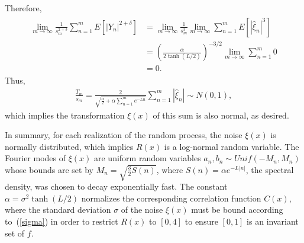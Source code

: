 Therefore, 
\begin{align*}
\begin{split}
\lim_{m\to
  \infty}\frac{1}{s_m^{2+\delta}}\sum_{n=1}^mE[|Y_n|^{2+\delta}] &= \lim_{m\to
  \infty}\frac{1}{s_m^{3}}\lim_{m\to
  \infty}\sum_{n=1}^mE[|\hat{\xi}_{n}|^{3}] \\
&= \left(\frac{\alpha}{2 \tanh(L/2)}\right)^{-3/2}\lim_{m\to \infty}\sum_{n=1}^m 0 \\
&= 0.
\end{split}
\end{align*}
Thus, 
\begin{align*}
\frac{T_m}{s_m} = \frac{2}{\sqrt{\frac{\alpha}{2} +\alpha\sum_{n=1}^m e^{-Ln}}} \sum_{n=1}^{m} |\hat{\xi}_{n}|\sim N(0,1),
\end{align*}
which implies the transformation $\xi(x)$ of this sum is also normal,
as desired.  

In summary, for each realization of the random process, the noise
$\xi(x)$ is normally distributed, which implies $R(x)$ is a log-normal
random variable. The Fourier modes of $\xi(x)$ are uniform random variables $a_n,b_n \sim Unif(-M_n,M_n)$ whose bounds are set by
$M_n= \sqrt{\frac{3}{2}S(n)}$, where $S(n)=\alpha e^{-L|n|}$, the
spectral density, was chosen to decay exponentially fast. The constant $\alpha = \sigma^2 \tanh(L/2)$ normalizes the corresponding
correlation function $C(x)$, where the standard deviation $\sigma$ of
the noise $\xi(x)$
must be bound according to~(\ref{sigma}) in order to restrict $R(x)$
to $[0,4]$ to ensure $[0,1]$ is an invariant set of
$f$.

